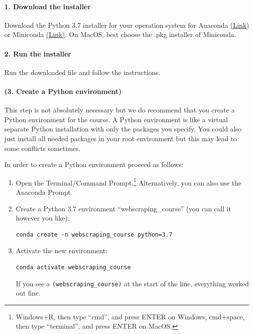 \documentclass[a4paper]{article}
\begin{document}
\paragraph{1. Download the installer} Download the Python 3.7 installer for your operation system for Anaconda \href{https://www.anaconda.com/distribution/}{(Link)} or Miniconda \href{https://docs.conda.io/en/latest/miniconda.html}{(Link)}. On MacOS, best choose the .pkg installer of Miniconda.

\paragraph{2. Run the installer} Run the downloaded file and follow the instructions.

\paragraph{(3. Create a Python environment)} This step is not absolutely necessary but we do recommend that you create a Python environment for the course. A Python environment is like a virtual separate Python installation with only the packages you specify. You could also just install all needed packages in your root environment but this may lead to some conflicts sometimes.

\clearpage{}

In order to create a Python environment proceed as follows:
\begin{enumerate}
	\item Open the Terminal/Command Prompt.\footnote{Windows+R, then type ``cmd'', and press ENTER on Windows; cmd+space, then type ``terminal'', and press ENTER on MacOS.} Alternatively, you can also use the Anaconda Prompt.
	\item Create a Python 3.7 environment ``webscraping\_course'' (you can call it however you like):
\begin{verbatim}
conda create -n webscraping_course python=3.7
\end{verbatim}
	\item Activate the new environment: 
\begin{verbatim}
conda activate webscraping_course
\end{verbatim} 
	If you see a \texttt{(webscraping_course)} at the start of the line, everything worked out fine.
\end{enumerate}
\end{document}

